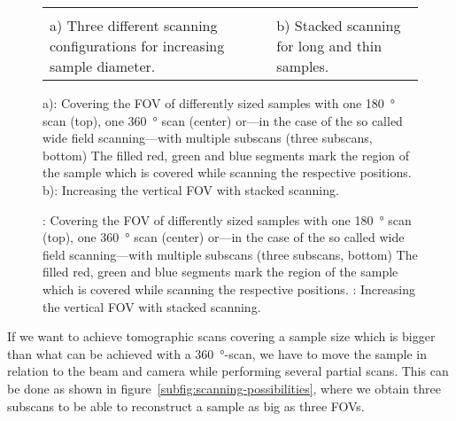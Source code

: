 \ifiucr
	\begin{figure}
		\centering
		\caption{a): Covering the FOV of differently sized samples with one \SI{180}{\degree} scan (top), one \SI{360}{\degree} scan (center) or---in the case of the so called wide field scanning---with multiple subscans (three subscans, bottom) The filled red, green and blue segments mark the region of the sample which is covered while scanning the respective positions. b): Increasing the vertical FOV with stacked scanning.}%
		\begin{tabular}{p{.4\linewidth}p{.4\linewidth}}%
			\label{subfig:scanning-possibilities}%
		&
			\label{subfig:stacked-scan}%
		\\
			a) Three different scanning configurations for increasing sample diameter.%
		&
			b) Stacked scanning for long and thin samples.%
		\\
		\end{tabular}%
		\label{fig:scanning-possibilities}%
	\end{figure}
\else
	\begin{figure}
		\noindent{}%
		\caption{: Covering the FOV of differently sized samples with one \SI{180}{\degree} scan (top), one \SI{360}{\degree} scan (center) or---in the case of the so called wide field scanning---with multiple subscans (three subscans, bottom) The filled red, green and blue segments mark the region of the sample which is covered while scanning the respective positions. : Increasing the vertical FOV with stacked scanning.
		}%
		\label{fig:scanning-possibilities}%
	\end{figure}
\fi

If we want to achieve tomographic scans covering a sample size which is bigger than what can be achieved with a \SI{360}{\degree}-scan, we have to move the sample in relation to the beam and camera while performing several partial scans. This can be done as shown in figure~\ref{subfig:scanning-possibilities}, where we obtain three subscans to be able to reconstruct a sample as big as three FOVs.

